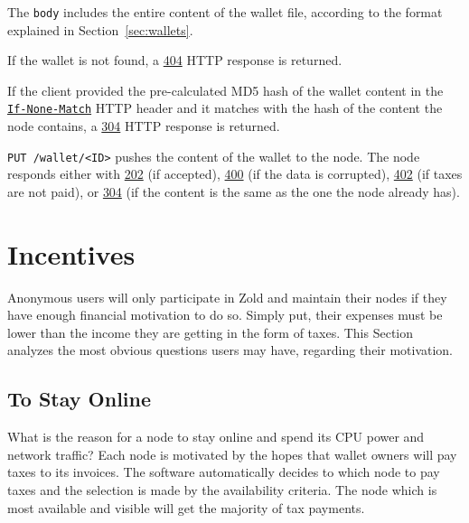 \documentclass[11pt,oneside]{article}
\newcommand\dd[1]{\colorbox{gray!30}{\texttt{#1}}}
\begin{document}
The \dd{body} includes the entire content of the wallet file, according
to the format explained in Section~\ref{sec:wallets}.

If the wallet is not found, a
\href{https://www.w3.org/Protocols/rfc2616/rfc2616-sec10.html#sec10.4.5}{404}
HTTP response is returned.

If the client provided the pre-calculated MD5 hash of the wallet content in the
\href{https://www.w3.org/Protocols/rfc2616/rfc2616-sec14.html#sec14.26}{\dd{If-None-Match}}
HTTP header and it matches with the hash of the
content the node contains, a
\href{https://www.w3.org/Protocols/rfc2616/rfc2616-sec10.html#sec10.3.5}{304} HTTP response is returned.

\dd{PUT /wallet/<ID>} pushes the content of the wallet to the node. The
node responds either with
\href{https://www.w3.org/Protocols/rfc2616/rfc2616-sec10.html#sec10.2.3}{202} (if accepted),
\href{https://www.w3.org/Protocols/rfc2616/rfc2616-sec10.html#sec10.4.1}{400} (if the data is corrupted),
\href{https://www.w3.org/Protocols/rfc2616/rfc2616-sec10.html#sec10.4.3}{402} (if taxes are not paid),
or
\href{https://www.w3.org/Protocols/rfc2616/rfc2616-sec10.html#sec10.3.5}{304}
(if the content is the same as the one the node already has).

\section{Incentives}\label{sec:incentives}

Anonymous users will only participate in Zold and maintain
their nodes if they have enough financial motivation to do so. Simply
put, their expenses must be lower than the income they are getting in
the form of taxes. This Section analyzes the most obvious questions users
may have, regarding their motivation.

\subsection{To Stay Online}

What is the reason for a node to stay online and spend its CPU power
and network traffic? Each node is motivated by the
hopes that wallet owners will pay taxes to its invoices. The software
automatically decides to which node to pay taxes and the selection is
made by the availability criteria. The node which is most available
and visible will get the majority of tax payments.
\end{document}
